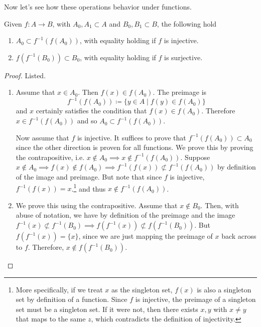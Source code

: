\documentclass{article}
\begin{document}
    Now let's see how these operations behavior under functions. 

    \begin{theorem}
      Given $f: A \rightarrow B$, with $A_0, A_1 \subset A$ and $B_0, B_1 \subset B$, the following hold 
      \begin{enumerate}
        \item $A_0 \subset f^{-1} (f(A_0))$, with equality holding if $f$ is injective. 
        \item $f(f^{-1}(B_0)) \subset B_0$, with equality holding if $f$ is surjective. 
      \end{enumerate}
    \end{theorem} 
    \begin{proof} 
      Listed. 
      \begin{enumerate}
        \item Assume that $x \in A_0$. Then $f(x) \in f(A_0)$. The preimage is 
        \begin{equation}
          f^{-1} (f(A_0)) \coloneqq \{ y \in A \mid f(y) \in f(A_0) \}
        \end{equation}
        and $x$ certainly satisfies the condition that $f(x) \in f(A_0)$. Therefore $x \in f^{-1} (f(A_0))$ and so $A_0 \subset f^{-1} (f(A_0))$. 

        Now assume that $f$ is injective. It suffices to prove that $f^{-1} (f(A_0)) \subset A_0$ since the other direction is proven for all functions. We prove this by proving the contrapositive, i.e. $x \not\in A_0 \implies x \not\in f^{-1} (f(A_0))$. Suppose $x \not\in A_0 \implies f(x) \not\in f(A_0) \implies f^{-1} (f(x)) \not\subset f^{-1} (f(A_0))$ by definition of the image and preimage. But note that since $f$ is injective, $f^{-1} (f(x)) = x$.\footnote{More specifically, if we treat $x$ as the singleton set, $f(x)$ is also a singleton set by definition of a function. Since $f$ is injective, the preimage of a singleton set must be a singleton set. If it were not, then there exists $x, y$ with $x \neq y$ that maps to the same $z$, which contradicts the definition of injectivity.} and thus $x \not\in f^{-1} (f(A_0))$. 

        \item We prove this using the contrapositive. Assume that $x \not\in B_0$. Then, with abuse of notation, we have by definition of the preimage and the image $f^{-1} (x) \not\subset f^{-1} (B_0) \implies f(f^{-1} (x)) \not\subset f(f^{-1}(B_0))$. But $f (f^{-1} (x)) = \{x\}$, since we are just mapping the preimage of $x$ back across to $f$. Therefore, $x \notin f( f^{-1} (B_0))$. 


\end{enumerate}
\end{proof}
\end{document}
